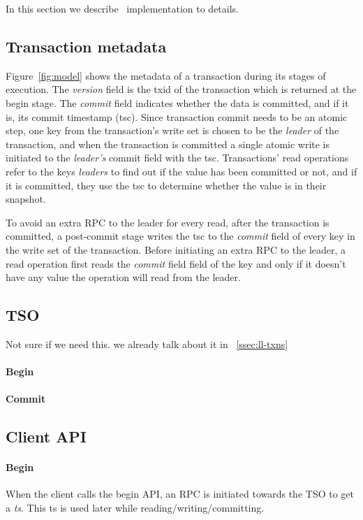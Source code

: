 In this section we describe \sys\ implementation to details.

\subsection{Transaction metadata}
\label{ssec:tso}
Figure~\ref{fig:model} shows the metadata of a transaction during its stages of execution. The \emph{version} field  is the txid of the transaction which is returned at the begin stage. The \emph{commit} field indicates whether the data is committed, and if it is, its commit timestamp (tsc). Since transaction commit needs to be an atomic step, one key from the transaction's write set is chosen to be the \emph{leader} of the transaction, and when the transaction is committed a single atomic write is initiated to the \emph{leader's} commit field with the tsc. Transactions' read operations refer to the keys \emph{leaders} to find out if the value has been committed or not, and if it is committed, they use the tsc to determine whether the value is in their snapshot.

To avoid an extra RPC to the leader for every read, after the transaction is committed, a post-commit stage writes the tsc to the \emph{commit} field of every key in the write set of the transaction. Before initiating an extra RPC to the leader, a read operation first reads the \emph{commit} field field of the key and only if it doesn't have any value the operation will read from the leader.

\subsection{TSO}
\label{ssec:tso}
Not sure if we need this. we already talk about it in ~\ref{ssec:ll-txns}
\paragraph{Begin}

\paragraph{Commit}

\subsection{Client API}
\label{ssec:api}

\paragraph{Begin}
When the client calls the begin API, an RPC is initiated towards the TSO to get a \emph{ts}. This ts is used later while reading/writing/committing.

